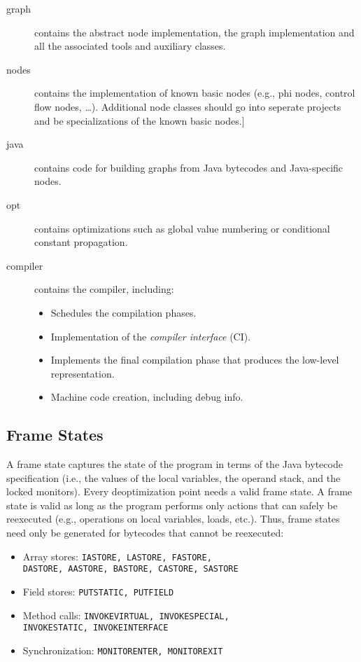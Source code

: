 \documentclass[twocolumn]{svjour3}
\begin{document}
\begin{description}
    \item[graph] contains the abstract node implementation, the graph implementation and all the associated tools and auxiliary classes.
    \item[nodes] contains the implementation of known basic nodes (e.g., phi nodes, control flow nodes, \ldots).
 				 Additional node classes should go into seperate projects and be specializations of the known basic nodes.]
    \item[java] contains code for building graphs from Java bytecodes and Java-specific nodes.
    \item[opt] contains optimizations such as global value numbering or conditional constant propagation.
    \item[compiler] contains the compiler, including:
        \begin{itemize}
            \item Schedules the compilation phases.
            \item Implementation of the \emph{compiler interface} (CI).
            \item Implements the final compilation phase that produces the low-level representation.
            \item Machine code creation, including debug info.
        \end{itemize}
\end{description}


\subsection{Frame States}
A frame state captures the state of the program in terms of the Java bytecode specification (i.e., the values of the local variables, the operand stack, and the locked monitors).
Every deoptimization point needs a valid frame state.
A frame state is valid as long as the program performs only actions that can safely be reexecuted (e.g., operations on local variables, loads, etc.).
Thus, frame states need only be generated for bytecodes that cannot be reexecuted:

\begin{itemize}
    \item Array stores: {\tt IASTORE, LASTORE, FASTORE, \\DASTORE, AASTORE, BASTORE, CASTORE, SASTORE}
    \item Field stores: {\tt PUTSTATIC, PUTFIELD}
    \item Method calls: {\tt INVOKEVIRTUAL, INVOKESPECIAL, \\INVOKESTATIC, INVOKEINTERFACE}
    \item Synchronization: {\tt MONITORENTER, MONITOREXIT}
\end{itemize}
\end{document}
